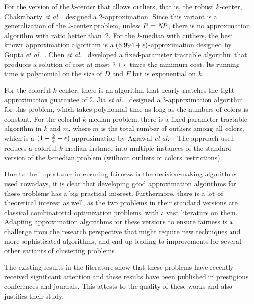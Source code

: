 For the version of the $k$-center that allows outliers, that is, the robust ${k\text{-center}}$, Chakrabarty \emph{et al.}~\cite{CGK2020} designed a 2-approximation. 
Since this variant is a generalization of the $k$-center problem, unless $P = \mathit{NP}$, there is no approximation algorithm with ratio better than~2. 
For the $k$-median with outliers, the best known approximation algorithm is a $(6.994 + \epsilon)$-approximation designed by Gupta \emph{et al.}~\cite{GMZ2021}.
Chen \emph{et al.}~\cite{CHXXZ2024} developed a fixed-parameter tractable algorithm that produces a solution of cost at most $3 + \epsilon$ times the minimum cost. Its running time is polynomial on the size of $D$ and $F$ but is exponential on $k$.

For the colorful $k$-center, there is an algorithm that nearly matches the tight approximation guarantee of 2. Jia \emph{et al.}~\cite{JSS2020} designed a 3-approximation algorithm for this problem, which takes polynomial time as long as the numbers of colors is constant.
For the colorful $k$-median problem, there is a fixed-parameter tractable algorithm in $k$ and $m$, where $m$ is the total number of outliers among all colors, which is a $(1 + \frac{2}{e} + \epsilon)$-approximation by Agrawal \emph{et al.}~\cite{AISX2024}. The approach used reduces a colorful $k$-median instance into multiple instances of the standard version of the $k$-median problem (without outliers or colors restrictions).

Due to the importance in ensuring fairness in the decision-making algorithms used nowadays, it is clear that developing good approximation algorithms for these problems has a big practical interest. 
Furthermore, there is a lot of theoretical interest as well, as the two problems in their standard versions are classical combinatorial optimization problems, with a vast literature on them. Adapting approximation algorithms for these versions to ensure fairness is a challenge from the research perspective that might require new techniques and more sophisticated algorithms, and end up leading to improvements for several other variants of clustering problems. 

The existing results in the literature show that these problems have recently received significant attention and these results have been published in prestigious conferences and journals. This attests to the quality of these works and also justifies their study.

